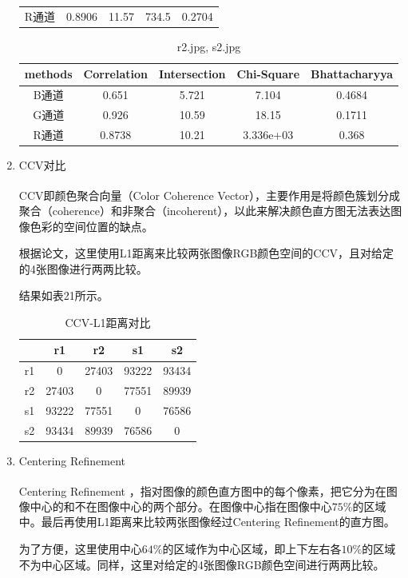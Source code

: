 \documentclass[a4paper, 12pt, UTF8]{article}
\begin{document}
\begin{enumerate}
\begin{table}[h!]
\begin{tabular}{ccccc}
        R通道 & 0.8906 & 11.57 & 734.5 & 0.2704 \\
    \end{tabular}
\end{table}
\begin{table}[h!]
    \centering
    \caption{r2.jpg, s2.jpg}
    \begin{tabular}{ccccc}
        methods & Correlation & Intersection & Chi-Square & Bhattacharyya \\ \hline
        B通道 & 0.651 & 5.721 & 7.104 & 0.4684 \\
        G通道 & 0.926 & 10.59 & 18.15 & 0.1711 \\
        R通道 & 0.8738 & 10.21 & 3.336e+03 & 0.368 \\
    \end{tabular}
\end{table}

\item CCV对比

CCV即颜色聚合向量（Color Coherence Vector）\textsuperscript{\cite{ref1}}，主要作用是将颜色簇划分成聚合（coherence）和非聚合（incoherent），以此来解决颜色直方图无法表达图像色彩的空间位置的缺点。

根据论文\cite{ref2}，这里使用L1距离来比较两张图像RGB颜色空间的CCV，且对给定的4张图像进行两两比较。

结果如表21所示。

\begin{table}[h!]
    \centering
    \caption{CCV-L1距离对比}
    \begin{tabular}{ccccc}
         & r1 & r2 & s1 & s2 \\ \hline
        r1 & 0 & 27403 & 93222 & 93434 \\ \hline
        r2 & 27403 & 0 & 77551 & 89939 \\ \hline
        s1 & 93222 & 77551 & 0 & 76586 \\ \hline
        s2 & 93434 & 89939 & 76586 & 0 \\ \hline
    \end{tabular}
\end{table}

\item Centering Refinement

Centering Refinement \textsuperscript{\cite{ref2}}，指对图像的颜色直方图中的每个像素，把它分为在图像中心的和不在图像中心的两个部分。在图像中心指在图像中心$75\%$的区域中。最后再使用L1距离来比较两张图像经过Centering Refinement的直方图。

为了方便，这里使用中心$64\%$的区域作为中心区域，即上下左右各$10\%$的区域不为中心区域。同样，这里对给定的4张图像RGB颜色空间进行两两比较。


\end{enumerate}
\end{document}
